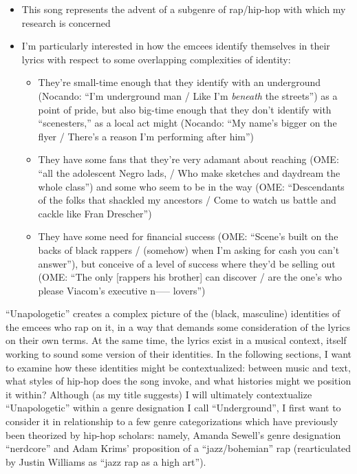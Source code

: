 \begin{itemize}
    \item This song represents the advent of a subgenre of rap/hip-hop with which my research is concerned
    \item I'm particularly interested in how the emcees identify themselves in their lyrics with respect to some 
    overlapping complexities of identity:
          \begin{itemize}
                \item They're small-time enough that they identify with an underground (Nocando: ``I'm underground man / Like 
                I'm  \emph{beneath} the streets'') as a point of pride, but also big-time enough that they don't identify with 
                ``scenesters,'' as a local act might (Nocando: ``My name's bigger on the flyer / There's a reason I'm performing
                after him'')
                \item They have some fans that they're very adamant about reaching (OME: ``all the adolescent Negro lads, / Who make 
                sketches and daydream the whole class'') and some who seem to be in the way (OME: ``Descendants of the folks that 
                shackled my ancestors / Come to watch us battle and cackle like Fran Drescher'')
                \item They have some need for financial success (OME: ``Scene's built on the backs of black rappers / (somehow) when
                I'm asking for cash you can't answer''), but conceive of a level of success where they'd be selling out (OME: ``The 
                only [rappers his brother] can discover / are the one's who please Viacom's executive n----- lovers'')
          \end{itemize}
\end{itemize}

``Unapologetic'' creates a complex picture of the (black, masculine) identities of the emcees who rap on it, in a way 
that demands some consideration of the lyrics on their own terms. At the same time, the lyrics exist in a musical context,
itself working to sound some version of their identities. In the following sections, I want to examine how these identities
might be contextualized: between music and text, what styles of hip-hop does the song invoke, and what histories might
we position it within? Although (as my title suggests) I will ultimately contextualize ``Unapologetic'' within a genre 
designation I call ``Underground'', I first want to consider it in relationship to a few genre categorizations which
have previously been theorized by hip-hop scholars: namely, Amanda Sewell's genre designation ``nerdcore'' and Adam Krims'
proposition of a ``jazz/bohemian'' rap (rearticulated by Justin Williams as ``jazz rap as a high art'').

